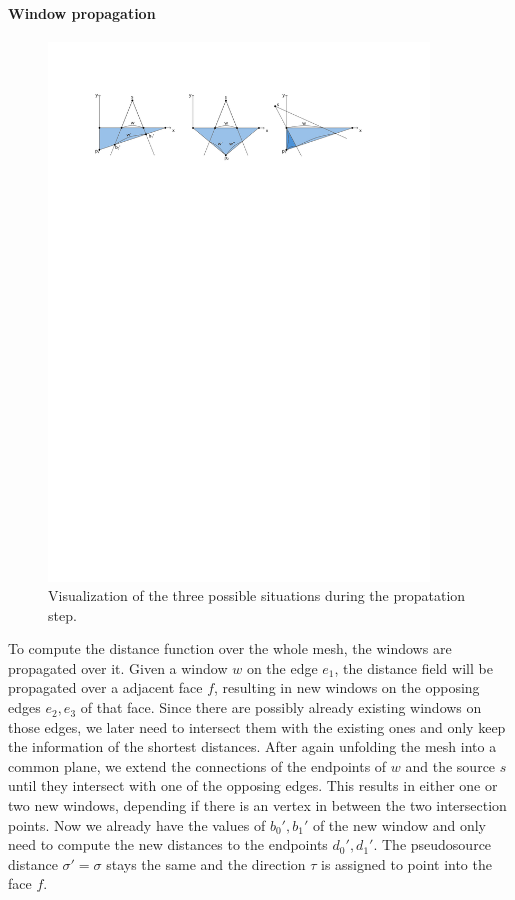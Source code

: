 \paragraph{Window propagation}
\begin{figure}[h]
	\centering
	\includegraphics[width = 0.9\textwidth]{pictures/geodesics_new_windows}
	\caption{Visualization of the three possible situations during the propatation step.}
	\label{fig:geo_new_windows}
\end{figure}
To compute the distance function over the whole mesh, the windows are propagated over it.
Given a window $w$ on the edge $e_1$, the distance field will be propagated over a adjacent face $f$, resulting in new windows on the opposing edges $e_2,e_3$ of that face.
Since there are possibly already existing windows on those edges, we later need to intersect them with the existing ones and only keep the information of the shortest distances.
After again unfolding the mesh into a common plane, we extend the connections of the endpoints of $w$ and the source $s$ until they intersect with one of the opposing edges.
This results in either one or two new windows, depending if there is an vertex in between the two intersection points.
Now we already have the values of $ b_0', b_1'$ of the new window and only need to compute the new distances to the endpoints $d_0',d_1'$.
The pseudosource distance $\sigma' = \sigma$ stays the same and the direction $\tau$ is assigned to point into the face $f$.

